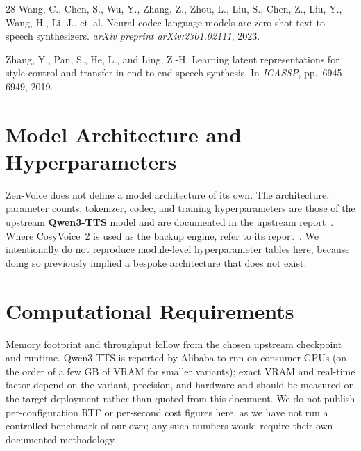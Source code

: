 \documentclass[11pt,a4paper]{article}
\begin{document}
\begin{thebibliography}{28}
Wang, C., Chen, S., Wu, Y., Zhang, Z., Zhou, L., Liu, S., Chen, Z., Liu, Y., Wang, H., Li, J., et~al.
\newblock Neural codec language models are zero-shot text to speech synthesizers.
\newblock \emph{arXiv preprint arXiv:2301.02111}, 2023.

Zhang, Y., Pan, S., He, L., and Ling, Z.-H.
\newblock Learning latent representations for style control and transfer in end-to-end speech synthesis.
\newblock In \emph{ICASSP}, pp.\ 6945--6949, 2019.

\end{thebibliography}

\appendix

\section{Model Architecture and Hyperparameters}
\label{app:hyperparams}

Zen-Voice does not define a model architecture of its own. The architecture,
parameter counts, tokenizer, codec, and training hyperparameters are those of the
upstream \textbf{Qwen3-TTS} model and are documented in the upstream
report~\citep{qwen3tts}. Where CosyVoice~2 is used as the backup engine, refer to its
report~\citep{cosyvoice2}. We intentionally do not reproduce module-level
hyperparameter tables here, because doing so previously implied a bespoke architecture
that does not exist.

\section{Computational Requirements}
\label{app:compute}

Memory footprint and throughput follow from the chosen upstream checkpoint and runtime.
Qwen3-TTS is reported by Alibaba to run on consumer GPUs (on the order of a few GB of
VRAM for smaller variants); exact VRAM and real-time factor depend on the variant,
precision, and hardware and should be measured on the target deployment rather than
quoted from this document. We do not publish per-configuration RTF or per-second cost
figures here, as we have not run a controlled benchmark of our own; any such numbers
would require their own documented methodology.
\end{document}
